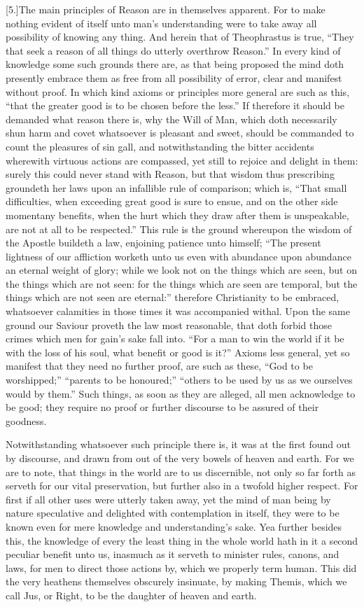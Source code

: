 [5.]The main principles of Reason are in themselves apparent. For to make nothing evident of itself unto man’s understanding were to take away all possibility of knowing any thing. And herein that of Theophrastus is true, “They that seek a reason of all things do utterly overthrow Reason.” In every kind of knowledge some such grounds there are, as that being proposed the mind doth presently embrace them as free from all possibility of error, clear and manifest without proof. In which kind axioms or principles more general are such as this, “that the greater good is to be chosen before the less.” If therefore it should be demanded what reason there is, why the Will of Man, which doth necessarily shun harm and covet whatsoever  is pleasant and sweet, should be commanded to count the pleasures of sin gall, and notwithstanding the bitter accidents wherewith virtuous actions are compassed, yet still to rejoice and delight in them: surely this could never stand with Reason, but that wisdom thus prescribing groundeth her laws upon an infallible rule of comparison; which is, “That small difficulties, when exceeding great good is sure to ensue, and on the other side momentany benefits, when the hurt which they draw after them is unspeakable, are not at all to be respected.” This rule is the ground whereupon the wisdom of the Apostle buildeth a law, enjoining patience unto himself; “The present lightness of our affliction worketh unto us even with abundance upon abundance an eternal weight of glory; while we look not on the things which are seen, but on the things which are not seen: for the things which are seen are temporal, but the things which are not seen are eternal:” therefore Christianity to be embraced, whatsoever calamities in those times it was accompanied withal. Upon the same ground our Saviour proveth the law most reasonable, that doth forbid those crimes which men for gain’s sake fall into. “For a man to win the world if it be with the loss of his soul, what benefit or good is it?” Axioms less general, yet so manifest that they need no further proof, are such as these, “God to be worshipped;” “parents to be honoured;” “others to be used by us as we ourselves would by them.” Such things, as soon as they are alleged, all men acknowledge to be good; they require no proof or further discourse to be assured of their goodness.

Notwithstanding whatsoever such principle there is, it was at the first found out by discourse, and drawn from out of the very bowels of heaven and earth. For we are to note, that things in the world are to us discernible, not only so far forth as serveth for our vital preservation, but further also in a twofold higher respect. For first if all other uses were utterly taken away, yet the mind of man being by nature speculative and delighted with contemplation in itself, they were to be known even for mere knowledge and understanding’s sake. Yea further besides this, the knowledge of every the least  thing in the whole world hath in it a second peculiar benefit unto us, inasmuch as it serveth to minister rules, canons, and laws, for men to direct those actions by, which we properly term human. This did the very heathens themselves obscurely insinuate, by making Themis, which we call Jus, or Right, to be the daughter of heaven and earth.

